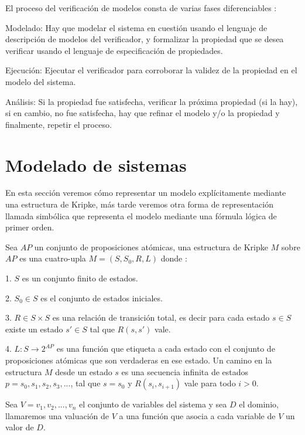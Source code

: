 El proceso del verificación de modelos consta de varias fases diferenciables \cite{Baier:2}:

Modelado: Hay que modelar el sistema en cuestión usando el lenguaje de descripción de modelos del verificador, y formalizar la propiedad que se desea verificar usando el lenguaje de especificación de propiedades.

Ejecución: Ejecutar el verificador para corroborar la validez de la propiedad en el modelo del sistema.

Análisis: Si la propiedad fue satisfecha, verificar la próxima propiedad (si la hay), si en cambio, no fue satisfecha, hay que refinar el modelo y/o la propiedad y finalmente, repetir el proceso.

\section{Modelado de sistemas}
En esta sección veremos cómo representar un modelo explícitamente mediante una estructura de Kripke, más tarde veremos otra forma de representación llamada simbólica que representa el modelo mediante una fórmula lógica de primer orden.

Sea $AP$ un conjunto de proposiciones atómicas, una estructura de Kripke $M$ sobre $AP$ es una cuatro-upla $M = (S, S_{0}, R, L)$ donde \cite{Clarke:1}:

1. $S$ es un conjunto finito de estados.

2. $S_{0} \in S$ es el conjunto de estados iniciales.

3. $R \in S \times S$ es una relación de transición total, es decir para cada estado $s \in S$ existe un estado $s' \in S$ tal que $R(s,s')$ vale.

4. $L \colon S \to 2^{AP}$ es una función que etiqueta a cada estado con el conjunto de proposiciones atómicas que son verdaderas en ese estado.
Un camino en la estructura $M$ desde un estado $s$ es una secuencia infinita de estados $p = s_{0}, s_{1}, s_{2}, s_{3}, ...$, tal que $s = s_{0}$ y $R(s_{i},s_{i+1})$ vale para todo $i>0$.

Sea $V = {v_{1}, v_{2}, ..., v_{n}}$ el conjunto de variables del sistema y sea $D$ el dominio, llamaremos una valuación de $V$ a una función que asocia a cada variable de $V$ un valor de $D$.

